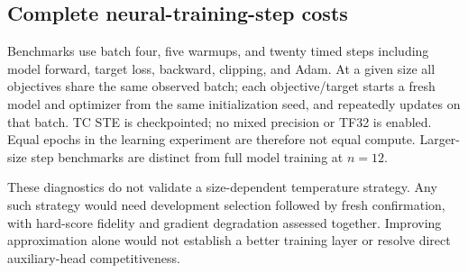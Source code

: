 \subsection{Complete neural-training-step costs}
Benchmarks use batch four, five warmups, and twenty timed steps including model forward, target loss, backward, clipping, and Adam. At a given size all objectives share the same observed batch; each objective/target starts a fresh model and optimizer from the same initialization seed, and repeatedly updates on that batch. TC STE is checkpointed; no mixed precision or TF32 is enabled. Equal epochs in the learning experiment are therefore not equal compute. Larger-size step benchmarks are distinct from full model training at $n=12$.

\begin{table}[ht]\centering\small

\caption{Recorded L40S complete batch-four training-step medians. Ratios compare STE structural loss with the auxiliary own-head loss on the common base model. They exclude data preparation and posterior inference and are not fit-to-convergence timings.}
\label{tab:gpu-cost}\end{table}

These diagnostics do not validate a size-dependent temperature strategy. Any such strategy would need development selection followed by fresh confirmation, with hard-score fidelity and gradient degradation assessed together. Improving approximation alone would not establish a better training layer or resolve direct auxiliary-head competitiveness.
